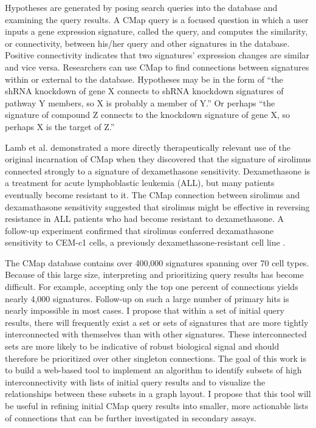\documentclass[12pt]{article}
\begin{document}
Hypotheses are generated by posing search queries into the database and examining the query results. A CMap query is a focused question in which a user inputs a gene expression signature, called the query, and computes the similarity, or connectivity, between his/her query and other signatures in the database. Positive connectivity indicates that two signatures' expression changes are similar and vice versa. Researchers can use CMap to find connections between signatures within or external to the database. Hypotheses may be in the form of ``the shRNA knockdown of gene X connects to shRNA knockdown signatures of pathway Y members, so X is probably a member of Y.'' Or perhaps ``the signature of compound Z connects to the knockdown signature of gene X, so perhaps X is the target of Z.''

Lamb et al. demonstrated a more directly therapeutically relevant use of the original incarnation of CMap when they discovered that the signature of sirolimus connected strongly to a signature of dexamethasone sensitivity. Dexamethasone is a treatment for acute lymphoblastic leukemia (ALL), but many patients eventually become resistant to it\cite{tissing_molecular_2003}. The CMap connection between sirolimus and dexamathasone sensitivity suggested that sirolimus might be effective in reversing resistance in ALL patients who had become resistant to dexamethasone. A follow-up experiment confirmed that sirolimus conferred dexamathasone sensitivity to CEM-c1 cells, a previously dexamethasone-resistant cell line \cite{lamb_connectivity_2006}. 

The CMap database contains over 400,000 signatures spanning over 70 cell types. Because of this large size, interpreting and prioritizing query results has become difficult. For example, accepting only the top one percent of connections yields nearly 4,000 signatures. Follow-up on such a large number of primary hits is nearly impossible in most cases. I propose that within a set of initial query results, there will frequently exist a set or sets of signatures that are more tightly interconnected with themselves than with other signatures. These interconnected sets are more likely to be indicative of robust biological signal and should therefore be prioritized over other singleton connections. The goal of this work is to build a web-based tool to implement an algorithm to identify subsets of high interconnectivity with lists of initial query results and to visualize the relationships between these subsets in a graph layout. I propose that this tool will be useful in refining initial CMap query results into smaller, more actionable lists of connections that can be further investigated in secondary assays.
\end{document}
